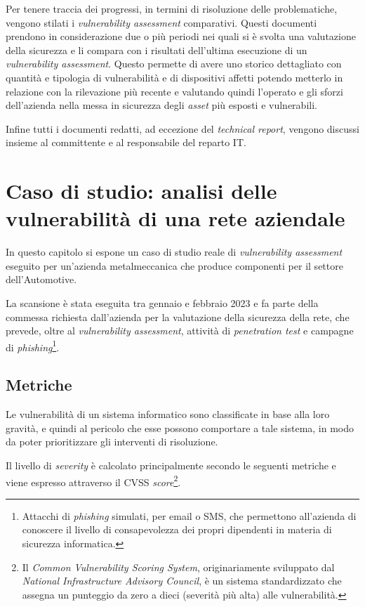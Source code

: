 \documentclass[target=bach,aauheader=]{thud}
\begin{document}
Per tenere traccia dei progressi, in termini di risoluzione delle problematiche, vengono stilati i \textit{vulnerability assessment} 
comparativi. Questi documenti prendono in considerazione due o più periodi nei quali si è svolta una valutazione della sicurezza e li compara con i risultati dell’ultima esecuzione di un \textit{vulnerability assessment}. Questo permette di avere uno storico dettagliato con quantità e tipologia di vulnerabilità e di dispositivi affetti potendo metterlo in relazione con la rilevazione più recente e valutando quindi l’operato e gli sforzi dell’azienda nella messa in sicurezza degli \textit{asset} più esposti e vulnerabili.

Infine tutti i documenti redatti, ad eccezione del \textit{technical report}, vengono discussi insieme al committente e al responsabile del reparto IT.

\chapter{Caso di studio: analisi delle vulnerabilità di una rete aziendale}
In questo capitolo si espone un caso di studio reale di \textit{vulnerability assessment} eseguito per un'azienda metalmeccanica che produce componenti per il settore dell'Automotive.

La scansione è stata eseguita tra gennaio e febbraio 2023 e fa parte della commessa richiesta dall'azienda per la valutazione della sicurezza della rete, che prevede, oltre al \textit{vulnerability assessment}, attività di \textit{penetration test} e campagne di \textit{phishing}\footnote{Attacchi di \textit{phishing} simulati, per email o SMS, che permettono all'azienda di conoscere il livello di consapevolezza dei propri dipendenti in materia di sicurezza informatica.}.

\section{Metriche}
Le vulnerabilità di un sistema informatico sono classificate in base alla loro gravità, e quindi al pericolo che esse possono comportare a tale sistema, in modo da poter prioritizzare gli interventi di risoluzione.

Il livello di \textit{severity} è calcolato principalmente secondo le seguenti metriche e viene espresso attraverso il CVSS \textit{score}\footnote{Il \textit{Common Vulnerability Scoring System}, originariamente sviluppato dal \textit{National Infrastructure Advisory Council}, è un sistema standardizzato che assegna un punteggio da zero a dieci (severità più alta) alle vulnerabilità.}.
\end{document}
